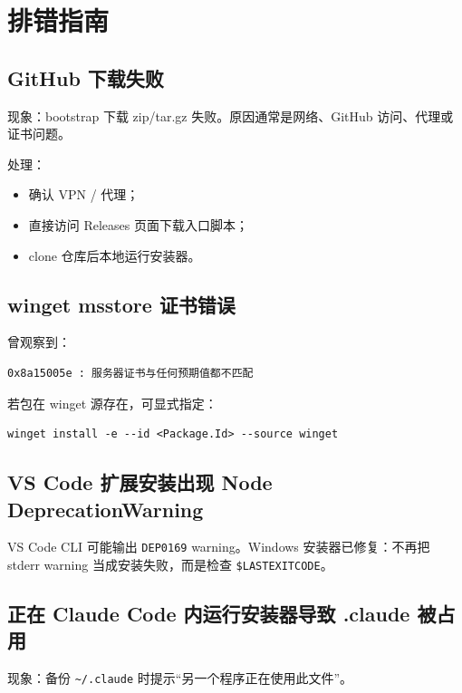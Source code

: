 \documentclass[11pt,a4paper]{ctexbook}
\begin{document}
\chapter{排错指南}

\section{GitHub 下载失败}

现象：bootstrap 下载 zip/tar.gz 失败。原因通常是网络、GitHub 访问、代理或证书问题。

处理：

\begin{itemize}[leftmargin=2em]
  \item 确认 VPN / 代理；
  \item 直接访问 Releases 页面下载入口脚本；
  \item clone 仓库后本地运行安装器。
\end{itemize}

\section{winget msstore 证书错误}

曾观察到：

\begin{lstlisting}[language={}]
0x8a15005e : 服务器证书与任何预期值都不匹配
\end{lstlisting}

若包在 winget 源存在，可显式指定：

\begin{lstlisting}[language={}]
winget install -e --id <Package.Id> --source winget
\end{lstlisting}

\section{VS Code 扩展安装出现 Node DeprecationWarning}

VS Code CLI 可能输出 \texttt{DEP0169} warning。Windows 安装器已修复：不再把 stderr warning 当成安装失败，而是检查 \texttt{\$LASTEXITCODE}。

\section{正在 Claude Code 内运行安装器导致 .claude 被占用}

现象：备份 \texttt{\textasciitilde/.claude} 时提示“另一个程序正在使用此文件”。
\end{document}
